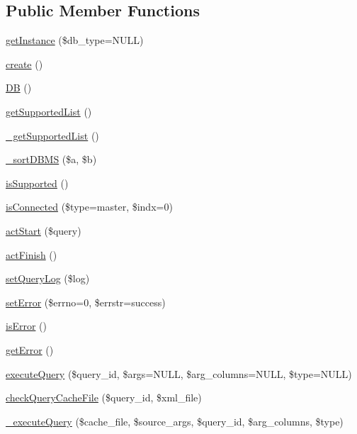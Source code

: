 \subsection*{Public Member Functions}
\begin{DoxyCompactItemize}
\item 
\hyperlink{classDB_a36df3da4b06cd9d45feccb6b82e612c8}{get\+Instance} (\$db\+\_\+type=N\+U\+LL)
\item 
\hyperlink{classDB_aad22e845daa75ae9ca9b97f7e3a89749}{create} ()
\item 
\hyperlink{classDB_a29a603c52c10831cddee82518417f992}{DB} ()
\item 
\hyperlink{classDB_a82226ac3fc6365c0771b13e389d216cf}{get\+Supported\+List} ()
\item 
\hyperlink{classDB_a7b0d1af98d9f53968631ca789d6d755c}{\+\_\+get\+Supported\+List} ()
\item 
\hyperlink{classDB_ab0a6d97fa16de74b4d991c9a4d633718}{\+\_\+sort\+D\+B\+MS} (\$a, \$b)
\item 
\hyperlink{classDB_a7517481bc9d24ad659f8d347688e481b}{is\+Supported} ()
\item 
\hyperlink{classDB_a835cb2e696c962b9b41a80f3a01b235f}{is\+Connected} (\$type=\textquotesingle{}master\textquotesingle{}, \$indx=0)
\item 
\hyperlink{classDB_a51a1ba94763a8211495eac18d74c80bb}{act\+Start} (\$query)
\item 
\hyperlink{classDB_a79cad647912ef780e967819e6346a742}{act\+Finish} ()
\item 
\hyperlink{classDB_a0adb7f453d6e8ed2e491d6708be7f9ec}{set\+Query\+Log} (\$log)
\item 
\hyperlink{classDB_a1a0c0becd564b8ca2a0c948e7de7467a}{set\+Error} (\$errno=0, \$errstr=\textquotesingle{}success\textquotesingle{})
\item 
\hyperlink{classDB_ab1433763c6378f1085606424a1bfe27c}{is\+Error} ()
\item 
\hyperlink{classDB_a3956fe8725f824d8c0a4f3cba449d6df}{get\+Error} ()
\item 
\hyperlink{classDB_a4541040cbc3f33b059bafd66f8cb0ada}{execute\+Query} (\$query\+\_\+id, \$args=N\+U\+LL, \$arg\+\_\+columns=N\+U\+LL, \$type=N\+U\+LL)
\item 
\hyperlink{classDB_a0bbeb84cee13c54916b7f9aac6db4791}{check\+Query\+Cache\+File} (\$query\+\_\+id, \$xml\+\_\+file)
\item 
\hyperlink{classDB_abb9920613c642481dc4c7b5f6f8fe9b2}{\+\_\+execute\+Query} (\$cache\+\_\+file, \$source\+\_\+args, \$query\+\_\+id, \$arg\+\_\+columns, \$type)

\end{DoxyCompactItemize}
